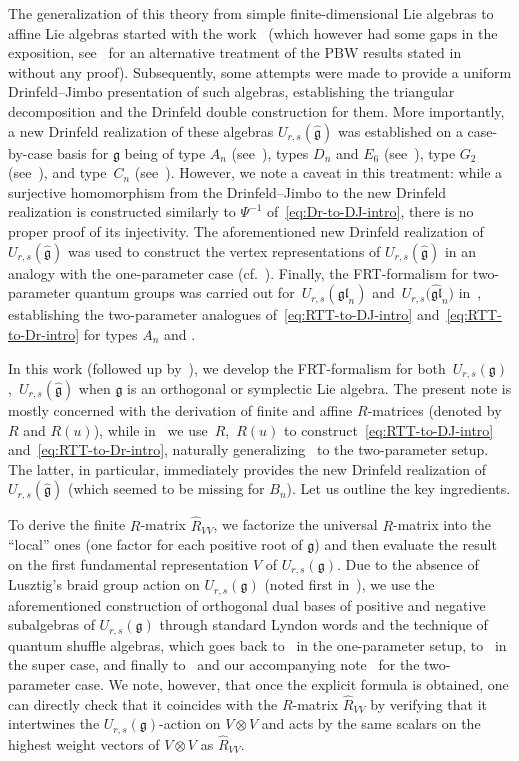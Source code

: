 \documentclass[10pt,a4paper]{amsart}
\numberwithin{equation}{section}
\newcommand{\fg}{\mathfrak{g}}
\newcommand{\gl}{\mathfrak{gl}}
\newcommand{\uu}{U_{r,s}(\fg)}
\newcommand{\UU}{U_{r,s}(\widehat{\fg})}
\begin{document}
The generalization of this theory from simple finite-dimensional Lie algebras to affine Lie algebras started with the work~\cite{HRZ} (which however had some gaps in the exposition, see~\cite{Ts} for an alternative treatment of the PBW results stated in~\cite{HRZ} without any proof). Subsequently, some attempts were made to provide a uniform Drinfeld--Jimbo presentation of such algebras, establishing the triangular decomposition and the Drinfeld double construction for them. More importantly, a new Drinfeld realization of these algebras $\UU$ was established on a case-by-case basis for $\fg$ being of type $A_n$ (see~\cite{HRZ}), types $D_n$ and $E_6$ (see~\cite{HZ2}), type $G_2$ (see~\cite{GHZ}), and type~$C_n$ (see~\cite{HZ1}). However, we note a caveat in this treatment: while a surjective homomorphism from the Drinfeld--Jimbo to the new Drinfeld realization is constructed similarly to $\Psi^{-1}$ of~\eqref{eq:Dr-to-DJ-intro}, there is no proper proof of its injectivity. The aforementioned new Drinfeld realization of $\UU$ was used to construct the vertex representations of $\UU$ in an analogy with the one-parameter case (cf.\ \cite{FJ}). Finally, the FRT-formalism for two-parameter quantum groups was carried out for~$U_{r,s}(\gl_n)$ and~$U_{r,s}\bigl(\widehat{\gl}_n\bigr)$ in~\cite{JL1,JL2}, establishing the two-parameter analogues of~\eqref{eq:RTT-to-DJ-intro} and~\eqref{eq:RTT-to-Dr-intro} for types $A_n$ and .

In this work (followed up by~\cite{MT2}), we develop the FRT-formalism for both~$\uu$,~$\UU$ when $\fg$ is an orthogonal or symplectic Lie algebra. The present note is mostly concerned with the derivation of finite and affine $R$-matrices (denoted by $R$ and $R(u)$), while in~\cite{MT2} we use~$R$,~$R(u)$ to construct~\eqref{eq:RTT-to-DJ-intro} and~\eqref{eq:RTT-to-Dr-intro}, naturally generalizing~\cite{JLM2, JLM1} to the two-parameter setup. The latter, in particular, immediately provides the new Drinfeld realization of $\UU$ (which seemed to be missing for $B_n$). Let us outline the key ingredients.

To derive the finite $R$-matrix $\hat{R}_{VV}$, we factorize the universal $R$-matrix into the ``local'' ones (one factor for each positive root of $\fg$) and then evaluate the result on the first fundamental representation $V$ of $\uu$. Due to the absence of Lusztig's braid group action on $\uu$ (noted first in~\cite{BGH1}), we use the aforementioned construction of orthogonal dual bases of positive and negative subalgebras of $\uu$ through standard Lyndon words and the technique of quantum shuffle algebras, which goes back to~\cite{K1,K2,L,Ro} in the one-parameter setup, to~\cite{CHW} in the super case, and finally to~\cite{BH,BKL,HW1,HW2} and our accompanying note~\cite{MT1} for the two-parameter case. We note, however, that once the explicit formula is obtained, one can directly check that it coincides with the $R$-matrix $\hat{R}_{VV}$ by verifying that it intertwines the $\uu$-action on $V\otimes V$ and acts by the same scalars on the highest weight vectors of $V\otimes V$ as $\hat{R}_{VV}$.
\end{document}
